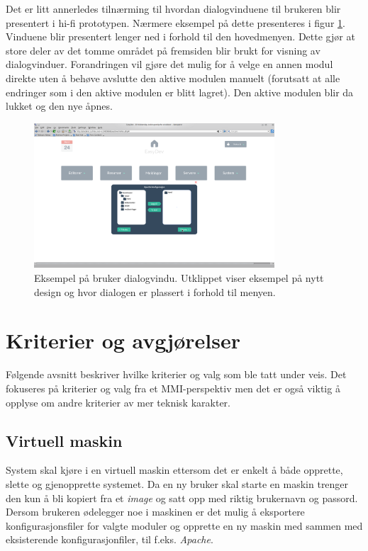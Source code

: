 Det er litt annerledes tilnærming til hvordan dialogvinduene til brukeren blir presentert i hi-fi prototypen. Nærmere eksempel på dette presenteres i figur \ref{fig:hifi_brukerdialog}. 
Vinduene blir presentert lenger ned i forhold til den hovedmenyen. Dette gjør at store deler av det tomme området på fremsiden blir brukt for visning av dialogvinduer. 
Forandringen vil gjøre det mulig for å velge en annen modul direkte uten å behøve avslutte den aktive modulen manuelt (forutsatt at alle endringer som i den aktive modulen er blitt lagret). Den aktive modulen blir da lukket og den nye åpnes.

\begin{figure}[ht]
\centering
\includegraphics[width=0.8\textwidth,keepaspectratio,trim = {12cm 6cm 12cm 8cm}, clip]{./img/prosessdokumentasjon/hifi/a2.png}
\caption[Hi-fi brukerdialog]{Eksempel på bruker dialogvindu. Utklippet viser eksempel på nytt design og hvor dialogen er plassert i forhold til menyen.}
\label{fig:hifi_brukerdialog}
\end{figure}

\section{Kriterier og avgjørelser}
Følgende avsnitt beskriver hvilke kriterier og valg som ble tatt under veis. Det fokuseres på kriterier og valg fra et MMI-perspektiv men det er også viktig å opplyse om andre kriterier av mer teknisk karakter.

\subsection{Virtuell maskin}
System skal kjøre i en virtuell maskin ettersom det er enkelt å både opprette, slette og gjenopprette systemet. Da en ny bruker skal starte en maskin trenger den kun å bli kopiert fra et \textit{image} og satt opp med riktig brukernavn og passord. Dersom brukeren ødelegger noe i maskinen er  det mulig å eksportere konfigurasjonsfiler for valgte moduler og opprette en ny maskin med sammen med eksisterende konfigurasjonfiler, til f.eks. \textit{Apache}.

